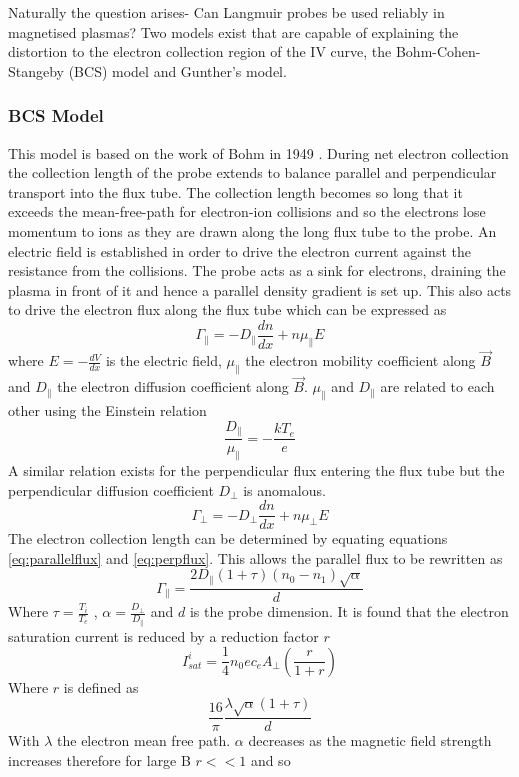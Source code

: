\documentclass[12pt]{article}
\def\be{\begin{equation}}
\def\ee{\end{equation}}
\begin{document}
Naturally the question arises- Can Langmuir probes be used reliably in magnetised plasmas? Two models exist that are capable of explaining the distortion to the electron collection region of the IV curve, the Bohm-Cohen-Stangeby (BCS) model and Gunther's model. 

\subsubsection{BCS Model}
This model is based on the work of Bohm in 1949 \cite{discharges}. During net electron collection the collection length of the probe extends to balance parallel and perpendicular transport into the flux tube. The collection length becomes so long that it exceeds the mean-free-path for electron-ion collisions and so the electrons lose momentum to ions as they are drawn along the long flux tube to the probe. An electric field is established in order to drive the electron current against the resistance from the collisions. The probe acts as a sink for electrons, draining the plasma in front of it and hence a parallel density gradient is set up. This also acts to drive the electron flux along the flux tube which can be expressed as 
\be
\Gamma_\parallel = -D_\parallel \frac{dn}{dx} + n \mu_\parallel E 
\label{eq:parallelflux}
\ee
where $E = - \frac{dV}{dx}$ is the electric field, $\mu_\parallel$ the electron mobility coefficient along $\vec{B}$ and $D_\parallel$ the electron diffusion coefficient along $\vec{B}$.
$\mu_\parallel$ and $D_\parallel$ are related to each other using the Einstein relation 
\be 
\frac{D_\parallel}{\mu_\parallel} = -\frac{kT_e}{e}
\ee 
A similar relation exists for the perpendicular flux entering the flux tube but the perpendicular diffusion coefficient $D_\perp$ is anomalous. 
\be
\Gamma_\perp = -D_\perp \frac{dn}{dx} + n \mu_\perp E 
\label{eq:perpflux}
\ee
The electron collection length can be determined by equating equations \eqref{eq:parallelflux} and \eqref{eq:perpflux}. This allows the parallel flux to be rewritten as 
\be
\Gamma_\parallel = \frac{2D_\parallel (1+\tau)(n_0 - n_1)\sqrt{\alpha}}{d}
\ee 
Where $\tau = \frac{T_i}{T_e}$ , $\alpha = \frac{D_\perp}{D_\parallel}$ and $d$ is the probe dimension. %
It is found that the electron saturation current is reduced by a reduction factor $r$ 
\be 
I^i_{sat} = \frac{1}{4} n_0 e c_e A_\perp \left(\frac{r}{1+r}\right) 
\ee
Where $r$ is defined as 
\be 
\frac{16}{\pi} \frac{\lambda \sqrt{\alpha} (1+\tau)}{d}
\ee
With $\lambda$ the electron mean free path. $\alpha$ decreases as the magnetic field strength increases therefore for large B $r << 1 $ and so 
\end{document}
